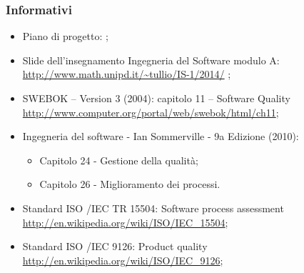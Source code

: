 \subsubsection{Informativi}
\begin{itemize}
\item Piano di progetto: \href{run:../../Esterni/\fPianoDiProgetto}{\fEscapePianoDiProgetto};
\item Slide dell’insegnamento Ingegneria del Software modulo A:\\
\url{http://www.math.unipd.it/~tullio/IS-1/2014/} ;
\item SWEBOK – Version 3 (2004): capitolo 11 – Software Quality\\
\url{http://www.computer.org/portal/web/swebok/html/ch11};
\item Ingegneria del software - Ian Sommerville - 9a Edizione (2010):
\begin{itemize}
	\item Capitolo 24 - Gestione della qualità;
	\item Capitolo 26 - Miglioramento dei processi.
\end{itemize}
\item Standard ISO /IEC TR 15504: Software process assessment\\ \url{http://en.wikipedia.org/wiki/ISO/IEC_15504};
\item Standard ISO /IEC 9126: Product quality\\ \url{http://en.wikipedia.org/wiki/ISO/IEC_9126};
\end{itemize}
